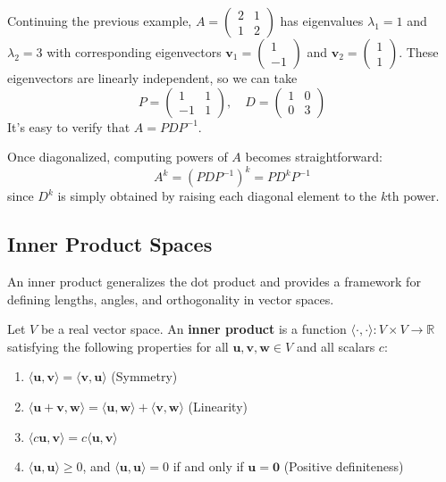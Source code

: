 \begin{example}
Continuing the previous example, $A = \begin{pmatrix} 2 & 1 \\ 1 & 2 \end{pmatrix}$ has eigenvalues $\lambda_1=1$ and $\lambda_2=3$ with corresponding eigenvectors $\mathbf{v}_1 = \begin{pmatrix} 1 \\ -1 \end{pmatrix}$ and $\mathbf{v}_2 = \begin{pmatrix} 1 \\ 1 \end{pmatrix}$. These eigenvectors are linearly independent, so we can take
\[
P = \begin{pmatrix} 1 & 1 \\ -1 & 1 \end{pmatrix}, \quad D = \begin{pmatrix} 1 & 0 \\ 0 & 3 \end{pmatrix}
\]
It's easy to verify that $A = PDP^{-1}$.
\end{example}

Once diagonalized, computing powers of $A$ becomes straightforward:
\[
A^k = (PDP^{-1})^k = PD^k P^{-1}
\]
since $D^k$ is simply obtained by raising each diagonal element to the $k$th power.

\subsection{Inner Product Spaces}

An inner product generalizes the dot product and provides a framework for defining lengths, angles, and orthogonality in vector spaces.

\begin{definition}
Let $V$ be a real vector space. An \textbf{inner product} is a function $\langle \cdot, \cdot \rangle: V \times V \to \mathbb{R}$ satisfying the following properties for all $\mathbf{u}, \mathbf{v}, \mathbf{w} \in V$ and all scalars $c$:
\begin{enumerate}
    \item $\langle \mathbf{u}, \mathbf{v} \rangle = \langle \mathbf{v}, \mathbf{u} \rangle$ (Symmetry)
    \item $\langle \mathbf{u} + \mathbf{v}, \mathbf{w} \rangle = \langle \mathbf{u}, \mathbf{w} \rangle + \langle \mathbf{v}, \mathbf{w} \rangle$ (Linearity)
    \item $\langle c\mathbf{u}, \mathbf{v} \rangle = c\langle \mathbf{u}, \mathbf{v} \rangle$
    \item $\langle \mathbf{u}, \mathbf{u} \rangle \ge 0$, and $\langle \mathbf{u}, \mathbf{u} \rangle = 0$ if and only if $\mathbf{u} = \mathbf{0}$ (Positive definiteness)
\end{enumerate}
\end{definition}

